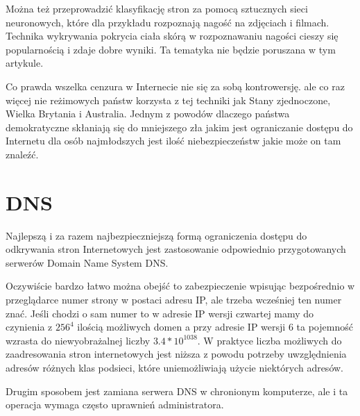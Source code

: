 \documentclass[9pt,a4paper]{extarticle}
\begin{document}
\begin{multicols}{2}
Można też przeprowadzić klasyfikację stron za pomocą sztucznych sieci neuronowych, które dla przykładu rozpoznają nagość na zdjęciach i filmach\cite{will_archer_arentz_classifying_nodate, radhouane_guermazi_combining_2007, giuseppe_amato_detection_2009}. Technika wykrywania pokrycia ciała skórą w rozpoznawaniu nagości cieszy się popularnością i zdaje dobre wyniki\cite{mohammad_reza_mahmoodi_high_nodate}. Ta tematyka nie będzie poruszana w tym artykule.

Co prawda wszelka cenzura w Internecie nie się za sobą kontrowersję\cite{jonathan_zittrain_internet_2003}. ale co raz więcej nie reżimowych państw korzysta z tej techniki jak Stany zjednoczone, Wielka Brytania i Australia. Jednym z powodów dlaczego państwa demokratyczne skłaniają się do mniejszego zła jakim jest ograniczanie dostępu do Internetu dla osób najmłodszych jest ilość niebezpieczeństw jakie może on tam znaleźć\cite{piotr_luczuk_cyberwojna_2016}.

\section{DNS}
Najlepszą i za razem najbezpieczniejszą formą ograniczenia dostępu do odkrywania stron Internetowych jest zastosowanie odpowiednio przygotowanych serwerów Domain Name System DNS\cite{j._postel_domain_1984, p._mockapetris_domain_1987, p._mockapetris_domain2_1987, yakov_rekhter_dynamic_1997, r._elz_clarifications_1997, d._eastlake_domain_1999}.

Oczywiście bardzo łatwo można obejść to zabezpieczenie wpisując  bezpośrednio w przeglądarce numer strony w postaci adresu IP, ale trzeba wcześniej ten numer znać. Jeśli chodzi o sam numer to w adresie IP wersji czwartej mamy do czynienia z  \({256}^{4}\) ilością możliwych domen a przy adresie IP wersji 6 ta pojemność wzrasta do niewyobrażalnej liczby \(3.4*10^{1038}\). W praktyce liczba możliwych do zaadresowania stron internetowych jest niższa z powodu potrzeby uwzględnienia adresów różnych klas podsieci, które uniemożliwiają użycie niektórych adresów.

Drugim sposobem jest zamiana serwera DNS w chronionym komputerze, ale i ta operacja wymaga często uprawnień administratora.
	

\end{multicols}
\end{document}
